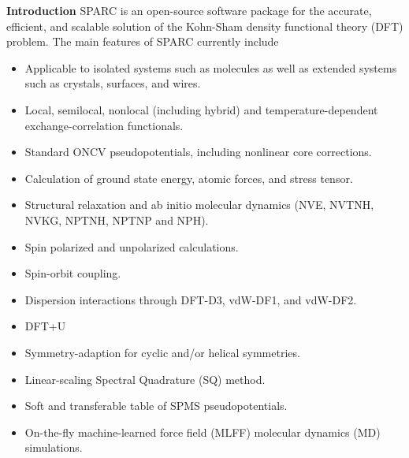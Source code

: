 \renewcommand{\thefootnote}{\fnsymbol{footnote}}

\begin{frame}[allowframebreaks]{\textbf{Introduction}} \label{Introduction}
  SPARC is an open-source software package for the accurate, efficient, and scalable solution of the Kohn-Sham density functional theory (DFT) problem. The main features of SPARC currently include
  \begin{itemize}
    \item Applicable to isolated systems such as molecules as well as extended systems such as crystals, surfaces, and wires.
    \item Local, semilocal, nonlocal (including hybrid) and temperature-dependent exchange-correlation functionals.
    \item Standard ONCV pseudopotentials, including nonlinear core corrections.
    \item Calculation of ground state energy, atomic forces, and stress tensor.
    \item Structural relaxation and ab initio molecular dynamics (NVE, NVTNH, NVKG, NPTNH, NPTNP and NPH).
    \item Spin polarized and unpolarized calculations.
    \item Spin-orbit coupling.
    \item Dispersion interactions through DFT-D3, vdW-DF1, and vdW-DF2.
    \item DFT+U
    \item Symmetry-adaption for cyclic and/or helical symmetries.
    \item Linear-scaling Spectral Quadrature (SQ) method.
    \item Soft and transferable table of SPMS pseudopotentials.
    \item On-the-fly machine-learned force field (MLFF) molecular dynamics (MD) simulations.
  \end{itemize}
  
  \end{frame}

